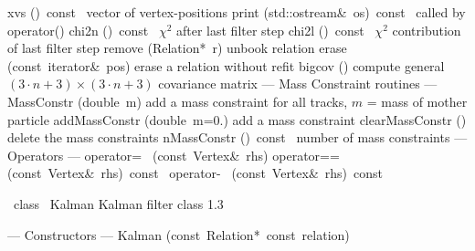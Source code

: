 \documentclass{article}
\begin{document}
\begin{cxxentry}
\begin{cxxclass}
\begin{cxxpublic}
        {xvs}
        {()\ const\ }
        { vector of vertex-positions}
        {}
\label{cxx.1.2.88}
        {print}
        {(std::ostream\&\ os)\ const\ }
        { called by operator\<\<()}
        {}
\label{cxx.1.2.89}
        {chi2n}
        {()\ const\ }
        { $\chi^2$ after last filter step}
        {}
\label{cxx.1.2.90}
        {chi2l}
        {()\ const\ }
        { $\chi^2$ contribution of last filter step}
        {}
\label{cxx.1.2.91}
        {remove}
        {(Relation*\ r)}
        { unbook relation}
        {}
\label{cxx.1.2.92}
        {erase}
        {(const\ iterator\&\ pos)}
        { erase a relation without refit}
        {}
\label{cxx.1.2.93}
        {bigcov}
        {()}
        { compute general $(3\cdot n+3) \times (3\cdot n+3)$ covariance matrix }
        {}
\label{cxx.1.2.94}
\cxxitem{}
        {--- Mass Constraint routines --- }
        {}
        {}
        {}
\label{cxx.1.2.95}
        {MassConstr}
        {(double\ m)}
        { add a mass constraint for all tracks, $m$ = mass of mother particle}
        {}
\label{cxx.1.2.96}
        {addMassConstr}
        {(double\ m=0.)}
        { add a mass constraint}
        {}
\label{cxx.1.2.97}
        {clearMassConstr}
        {()}
        { delete the mass constraints}
        {}
\label{cxx.1.2.98}
        {nMassConstr}
        {()\ const\ }
        { number of mass constraints}
        {}
\label{cxx.1.2.99}
\cxxitem{}
        {--- Operators --- }
        {}
        {}
        {}
\label{cxx.1.2.100}
        {operator=\ }
        {(const\ Vertex\&\ rhs)}
        {}
        {}
\label{cxx.1.2.101}
        {operator==}
        {(const\ Vertex\&\ rhs)\ const\ }
        {}
        {}
\label{cxx.1.2.102}
        {operator-\ }
        {(const\ Vertex\&\ rhs)\ const\ }
        {}
        {}
\label{cxx.1.2.103}
\end{cxxpublic}
\end{cxxclass}
\begin{cxxclass}
{\ class\ }
        {Kalman}
        {}
        {Kalman filter class}
        {1.3}
\begin{cxxpublic}
\cxxitem{}
        {--- Constructors --- }
        {}
        {}
        {}
\label{cxx.1.3.1}
\cxxitem{}
        {Kalman}
        {(const\ Relation*\ const\ relation)}

\end{cxxpublic}
\end{cxxclass}
\end{cxxentry}
\end{document}
